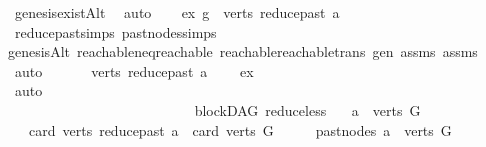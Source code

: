 \begin{isabellebody}
\ genesis{\isacharunderscore}{\kern0pt}existAlt\ \isamarkupfalse%
\ auto\isanewline
\ \ \isamarkupfalse%
\ ex{\isacharcolon}{\kern0pt}\ {\isachardoublequoteopen}g\ {\isasymin}\ verts\ {\isacharparenleft}{\kern0pt}reduce{\isacharunderscore}{\kern0pt}past\ a{\isacharparenright}{\kern0pt}{\isachardoublequoteclose}\ \isamarkupfalse%
\ reduce{\isacharunderscore}{\kern0pt}past{\isachardot}{\kern0pt}simps\ past{\isacharunderscore}{\kern0pt}nodes{\isachardot}{\kern0pt}simps\ \isanewline
genesisAlt\ reachable{\isacharunderscore}{\kern0pt}neq{\isacharunderscore}{\kern0pt}reachable{}\ reachable{\isacharunderscore}{\kern0pt}reachable{}{\isacharunderscore}{\kern0pt}trans\ gen\ assms{\isacharparenleft}{\kern0pt}{}{\isacharparenright}{\kern0pt}\ assms{\isacharparenleft}{\kern0pt}{}{\isacharparenright}{\kern0pt}\ \isamarkupfalse%
\ auto\ \isanewline
\ \ \isamarkupfalse%
\ \isamarkupfalse%
\ {\isachardoublequoteopen}{\isacharparenleft}{\kern0pt}verts\ {\isacharparenleft}{\kern0pt}reduce{\isacharunderscore}{\kern0pt}past\ a{\isacharparenright}{\kern0pt}{\isacharparenright}{\kern0pt}\ {\isasymnoteq}\ {\isacharbraceleft}{\kern0pt}{\isacharbraceright}{\kern0pt}{\isachardoublequoteclose}\ \isamarkupfalse%
\ ex\ \isamarkupfalse%
\ auto\ \ \ \ \ \ \ \ \ \ \ \ \ \ \ \ \ \ \ \ \ \ \ \ \ \ \ \ \ \ \ \ \ \ \ \ \ \ \ \ \ \ \ \ \ \ \ \ \ \ \ \ \ \ \ \ \ \ \ \ \ \ \ \ \ \ \ \ \ \ \ \ \ \ \ \ \ \ \ \ \ \ \ \ \ \ \ \ \ \ \ \isanewline
{}\isamarkupfalse%
%
\endisatagproof
{\isafoldproof}%
%
\isadelimproof
\isanewline
%
\endisadelimproof
\isanewline
{}\isamarkupfalse%
\ {\isacharparenleft}{\kern0pt}\ blockDAG{\isacharparenright}{\kern0pt}\ reduce{\isacharunderscore}{\kern0pt}less{\isacharcolon}{\kern0pt}\isanewline
\ \ \ {\isachardoublequoteopen}a\ {\isasymin}\ verts\ G{\isachardoublequoteclose}\isanewline
\ \ \ {\isachardoublequoteopen}card\ {\isacharparenleft}{\kern0pt}verts\ {\isacharparenleft}{\kern0pt}reduce{\isacharunderscore}{\kern0pt}past\ a{\isacharparenright}{\kern0pt}{\isacharparenright}{\kern0pt}\ {\isacharless}{\kern0pt}\ card\ {\isacharparenleft}{\kern0pt}verts\ G{\isacharparenright}{\kern0pt}{\isachardoublequoteclose}\isanewline
%
\isadelimproof
%
\endisadelimproof
%
\isatagproof
{}\isamarkupfalse%
\ {\isacharminus}{\kern0pt}\isanewline
\ \ \isamarkupfalse%
\ {\isachardoublequoteopen}past{\isacharunderscore}{\kern0pt}nodes\ a\ {\isasymsubset}\ verts\ G{\isachardoublequoteclose}\isanewline

\end{isabellebody}
